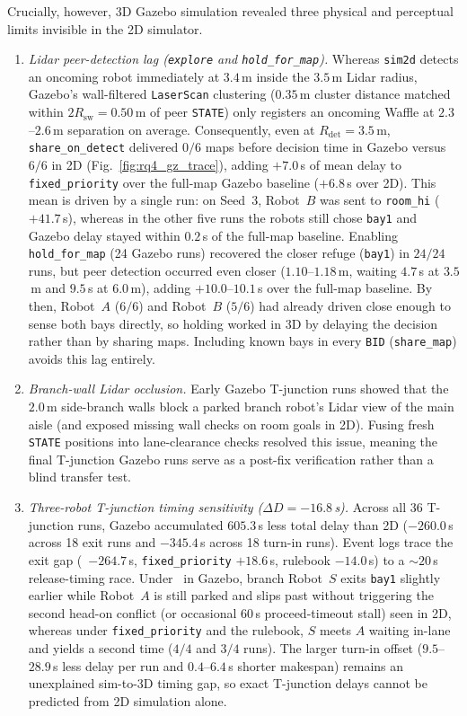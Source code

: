 Crucially, however, 3D Gazebo simulation revealed three physical and perceptual limits invisible in the 2D simulator.
\begin{enumerate}
\item \emph{Lidar peer-detection lag (\texttt{explore} and \texttt{hold\_for\_map}).} Whereas \texttt{sim2d} detects an oncoming robot immediately at $3.4$\,m inside the $3.5$\,m Lidar radius, Gazebo's wall-filtered \texttt{LaserScan} clustering ($0.35$\,m cluster distance matched within $2R_{\mathrm{sw}}=0.50$\,m of peer \texttt{STATE}) only registers an oncoming Waffle at $2.3$--$2.6$\,m separation on average. Consequently, even at $R_{\mathrm{det}}=3.5$\,m, \texttt{share\_on\_detect} delivered $0/6$ maps before decision time in Gazebo versus $6/6$ in 2D (Fig.~\ref{fig:rq4_gz_trace}), adding $+7.0$\,s of mean delay to \texttt{fixed\_priority} over the full-map Gazebo baseline ($+6.8$\,s over 2D). This mean is driven by a single run: on Seed~3, Robot~$B$ was sent to \texttt{room\_hi} ($+41.7$\,s), whereas in the other five runs the robots still chose \texttt{bay1} and Gazebo delay stayed within $0.2$\,s of the full-map baseline. Enabling \texttt{hold\_for\_map} (24 Gazebo runs) recovered the closer refuge (\texttt{bay1}) in $24/24$ runs, but peer detection occurred even closer ($1.10$--$1.18$\,m, waiting $4.7$\,s at $3.5$\,m and $9.5$\,s at $6.0$\,m), adding $+10.0$--$10.1$\,s over the full-map baseline. By then, Robot~$A$ ($6/6$) and Robot~$B$ ($5/6$) had already driven close enough to sense both bays directly, so holding worked in 3D by delaying the decision rather than by sharing maps. Including known bays in every \texttt{BID} (\texttt{share\_map}) avoids this lag entirely.
\item \emph{Branch-wall Lidar occlusion.} Early Gazebo T-junction runs showed that the $2.0$\,m side-branch walls block a parked branch robot's Lidar view of the main aisle (and exposed missing wall checks on room goals in 2D). Fusing fresh \texttt{STATE} positions into lane-clearance checks resolved this issue, meaning the final T-junction Gazebo runs serve as a post-fix verification rather than a blind transfer test.
\item \emph{Three-robot T-junction timing sensitivity ($\Delta D=-16.8$\,s).} Across all 36 T-junction runs, Gazebo accumulated $605.3$\,s less total delay than 2D ($-260.0$\,s across 18 exit runs and $-345.4$\,s across 18 turn-in runs). Event logs trace the exit gap (\cb\ $-264.7$\,s, \texttt{fixed\_priority} $+18.6$\,s, rulebook $-14.0$\,s) to a $\sim 20$\,s release-timing race. Under \cb\ in Gazebo, branch Robot~$S$ exits \texttt{bay1} slightly earlier while Robot~$A$ is still parked and slips past without triggering the second head-on conflict (or occasional $60$\,s proceed-timeout stall) seen in 2D, whereas under \texttt{fixed\_priority} and the rulebook, $S$ meets $A$ waiting in-lane and yields a second time ($4/4$ and $3/4$ runs). The larger turn-in offset ($9.5$--$28.9$\,s less delay per run and $0.4$--$6.4$\,s shorter makespan) remains an unexplained sim-to-3D timing gap, so exact T-junction delays cannot be predicted from 2D simulation alone.
\end{enumerate}

